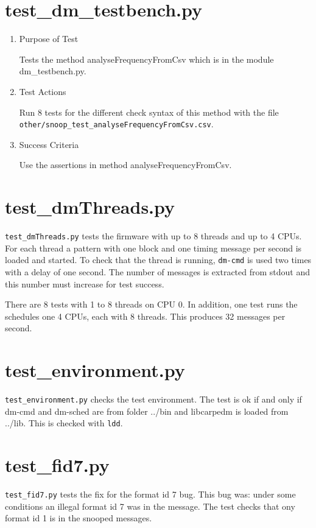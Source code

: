 \documentclass[12pt,a4paper]{report}
\begin{document}
\section{test\_dm\_testbench.py}
\begin{enumerate}
  \item Purpose of Test

  Tests the method analyseFrequencyFromCsv which is in
  the module dm\_testbench.py.
  \item Test Actions

  Run 8 tests for the different check syntax of this method with the
  file \texttt{other/snoop\_test\_analyseFrequencyFromCsv.csv}.
  \item Success Criteria

  Use the assertions in method analyseFrequencyFromCsv.
\end{enumerate}

\section{test\_dmThreads.py}
\texttt{test\_dmThreads.py} tests the firmware with up to 8 threads and up to 4 CPUs.
For each thread a pattern with one block and one timing message per second is
loaded and started. To check that the thread is running,
\texttt{dm-cmd} is used two times with a delay of one second. The number
of messages is extracted from stdout and this number must increase for test success.

There are 8 tests with 1 to 8 threads on CPU 0. In addition, one test runs
the schedules one 4 CPUs, each with 8 threads. This produces 32 messages per second.

\section{test\_environment.py}
\texttt{test\_environment.py} checks the test environment. The test is ok if and only if dm-cmd and dm-sched are
from folder ../bin and libcarpedm is loaded from ../lib. This is checked with \texttt{ldd}.

\section{test\_fid7.py}
\texttt{test\_fid7.py} tests the fix for the format id 7 bug. This bug
was: under some conditions an illegal format id 7 was in the message.
The test checks that ony format id 1 is in the snooped messages.
\end{document}
